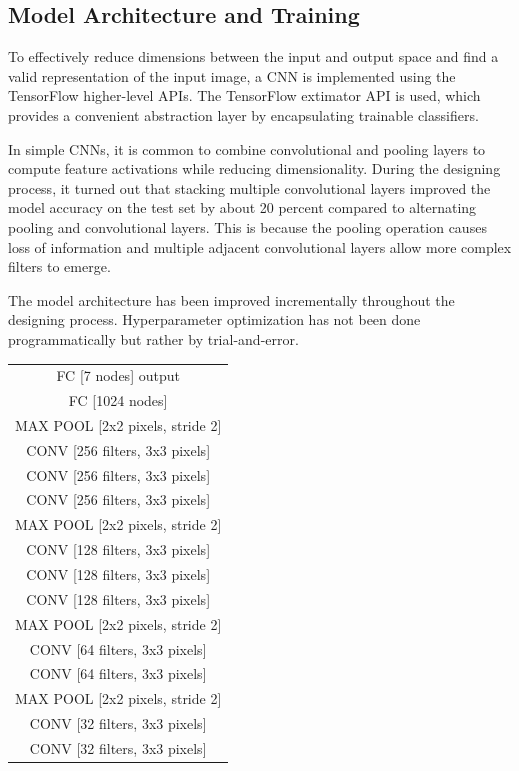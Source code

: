 \documentclass[twoside]{article}
\begin{document}
\begin{multicols}{2}

\section{Model Architecture and Training}
To effectively reduce dimensions between the input and output space and find a valid representation of the input image, a CNN is implemented using the TensorFlow higher-level APIs. The TensorFlow extimator API is used, which provides a convenient abstraction layer by encapsulating trainable classifiers.

In simple CNNs, it is common to combine convolutional and pooling layers to compute feature activations while reducing dimensionality. During the designing process, it turned out that stacking multiple convolutional layers improved the model accuracy on the test set by about 20 percent compared to alternating pooling and convolutional layers. This is because the pooling operation causes loss of information and multiple adjacent convolutional layers allow more complex filters to emerge.

The model architecture has been improved incrementally throughout the designing process. Hyperparameter optimization has not been done programmatically but rather by trial-and-error.

\bigskip

\begin{tabular}{|| c ||}

  \hline
  FC [7 nodes] output\\
  FC [1024 nodes]\\
  \hline
  MAX POOL [2x2 pixels, stride 2]\\
  CONV [256 filters, 3x3 pixels]\\
  CONV [256 filters, 3x3 pixels]\\
  CONV [256 filters, 3x3 pixels]\\
  \hline
  MAX POOL [2x2 pixels, stride 2]\\
  CONV [128 filters, 3x3 pixels]\\
  CONV [128 filters, 3x3 pixels]\\
  CONV [128 filters, 3x3 pixels]\\
  \hline
  MAX POOL [2x2 pixels, stride 2]\\
  CONV [64 filters, 3x3 pixels]\\
  CONV [64 filters, 3x3 pixels]\\
  \hline
  MAX POOL [2x2 pixels, stride 2]\\
  CONV [32 filters, 3x3 pixels]\\
  CONV [32 filters, 3x3 pixels]\\
  \hline
    

\end{tabular}
\end{multicols}
\end{document}
